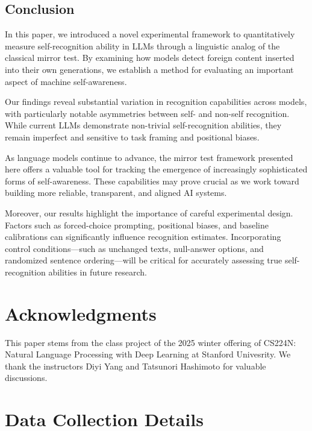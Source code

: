 \documentclass{article}
\begin{document}
\subsection{Conclusion}

In this paper, we introduced a novel experimental framework to quantitatively measure self-recognition ability in LLMs through a linguistic analog of the classical mirror test. By examining how models detect foreign content inserted into their own generations, we establish a method for evaluating an important aspect of machine self-awareness.

Our findings reveal substantial variation in recognition capabilities across models, with particularly notable asymmetries between self- and non-self recognition. While current LLMs demonstrate non-trivial self-recognition abilities, they remain imperfect and sensitive to task framing and positional biases.

As language models continue to advance, the mirror test framework presented here offers a valuable tool for tracking the emergence of increasingly sophisticated forms of self-awareness. These capabilities may prove crucial as we work toward building more reliable, transparent, and aligned AI systems.

Moreover, our results highlight the importance of careful experimental design. Factors such as forced-choice prompting, positional biases, and baseline calibrations can significantly influence recognition estimates. Incorporating control conditions—such as unchanged texts, null-answer options, and randomized sentence ordering—will be critical for accurately assessing true self-recognition abilities in future research.



\section*{Acknowledgments}
This paper stems from the class project of the 2025 winter offering of CS224N: Natural Language Processing with Deep Learning at Stanford Univesrity. We thank the instructors Diyi Yang and Tatsunori Hashimoto for valuable discussions.





\appendix

\section{Data Collection Details}
\label{Appendix:DataCollectionDetails}
\end{document}
